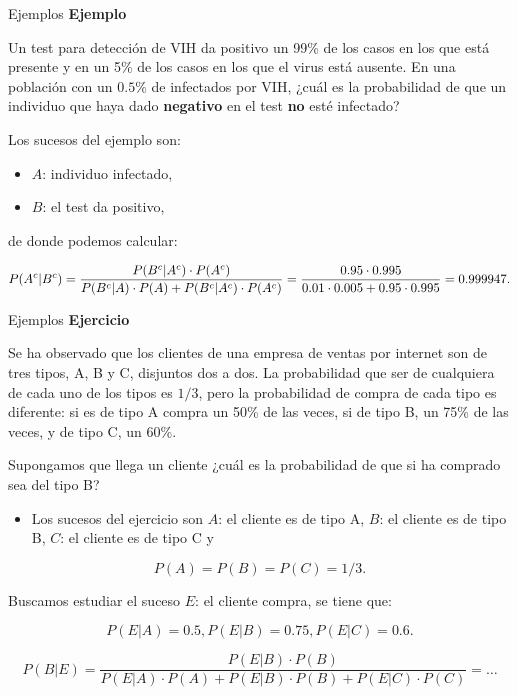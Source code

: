 \documentclass[
  ignorenonframetext,
  aspectratio=169]{beamer}
\providecommand{\tightlist}{%
  \setlength{\itemsep}{0pt}\setlength{\parskip}{0pt}}\usepackage{longtable,booktabs,array}
\begin{document}
\begin{frame}{Ejemplos}
\label{ejemplos-6}
\textbf{Ejemplo}

Un test para detección de VIH da positivo un 99\% de los casos en los
que está presente y en un 5\% de los casos en los que el virus está
ausente. En una población con un \(0.5\%\) de infectados por VIH, ¿cuál
es la probabilidad de que un individuo que haya dado \textbf{negativo}
en el test \textbf{no} esté infectado?

Los sucesos del ejemplo son:

\begin{itemize}
\tightlist
\item
  \(A\): individuo infectado,
\item
  \(B\): el test da positivo,
\end{itemize}

de donde podemos calcular:

\[
\scriptsize{P(A^c|B^c) =\dfrac{P(B^c|A^c)\cdot P(A^c)}{P(B^c|A)\cdot P(A)+P(B^c|A^c)\cdot P(A^c)}=\dfrac{0.95\cdot 0.995}{0.01\cdot 0.005+0.95\cdot 0.995}=0.999947.}
\]
\end{frame}

\begin{frame}{Ejemplos}
\label{ejemplos-7}
\textbf{Ejercicio}

Se ha observado que los clientes de una empresa de ventas por internet
son de tres tipos, A, B y C, disjuntos dos a dos. La probabilidad que
ser de cualquiera de cada uno de los tipos es \(1/3\), pero la
probabilidad de compra de cada tipo es diferente: si es de tipo A compra
un 50\% de las veces, si de tipo B, un 75\% de las veces, y de tipo C,
un 60\%.

Supongamos que llega un cliente ¿cuál es la probabilidad de que si ha
comprado sea del tipo B?

\begin{itemize}
\tightlist
\item
  Los sucesos del ejercicio son \(A\): el cliente es de tipo A, \(B\):
  el cliente es de tipo B, \(C\): el cliente es de tipo C y
\end{itemize}

\[P(A)=P(B)=P(C)=1/3.\]

Buscamos estudiar el suceso \(E\): el cliente compra, se tiene que:

\[P(E|A)=0.5, P(E|B)=0.75, P(E|C)=0.6.\]

\[P(B|E)\!=\!\dfrac{P(E|B)\cdot P(B)}{P(E|A)\!\cdot\! P(A)\!+\!P(E|B)\!\cdot\! P(B)\!+\!P(E|C)\!\cdot\! P(C)}\!=\!\ldots\]
\end{frame}
\end{document}
